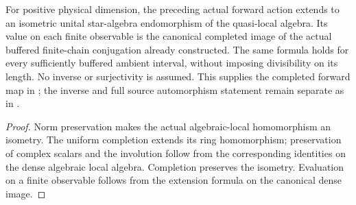 \begin{lemma}
    \label{thm:mpu_finite_heisenberg_completed_forward_action}
    \leanok
    For positive physical dimension, the preceding actual forward action
    extends to an isometric unital star-algebra endomorphism of the
    quasi-local algebra. Its value on each finite observable is the
    canonical completed image of the actual buffered finite-chain
    conjugation already constructed. The same formula holds for every
    sufficiently buffered ambient interval, without imposing divisibility
    on its length. No inverse or surjectivity is
    assumed. This supplies the completed forward map in
    \cite[lines~2296--2306]{Cirac2017MPU}; the inverse and full source
    automorphism statement remain separate as in
    \cite{gap:mpu_qca_complete_block_heisenberg_scope}.
\end{lemma}
\begin{proof}\leanok
    Norm preservation makes the actual algebraic-local homomorphism an
    isometry. The uniform completion extends its ring homomorphism;
    preservation of complex scalars and the involution follow from the
    corresponding identities on the dense algebraic local algebra.
    Completion preserves the isometry. Evaluation on a finite observable
    follows from the extension formula on the canonical dense image.
\end{proof}

